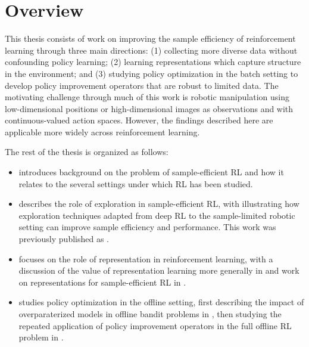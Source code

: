\section{Overview}

This thesis consists of work on improving the sample efficiency of reinforcement learning through three main directions: (1) collecting more diverse data without confounding policy learning; (2) learning representations which capture structure in the environment; and (3) studying policy optimization in the batch setting to develop policy improvement operators that are robust to limited data.
The motivating challenge through much of this work is robotic manipulation using low-dimensional positions or high-dimensional images as observations and with continuous-valued action spaces.
However, the findings described here are applicable more widely across reinforcement learning.

The rest of the thesis is organized as follows:
\begin{itemize}
    \item {} introduces background on the problem of sample-efficient RL and how it relates to the several settings under which RL has been studied.
    \item {} describes the role of exploration in sample-efficient RL, with  illustrating how exploration techniques adapted from deep RL to the sample-limited robotic setting can improve sample efficiency and performance. This work was previously published as \citet{whitney2021decoupled}.
    \item {} focuses on the role of representation in reinforcement learning, with a discussion of the value of representation learning more generally in  \citep{whitney2021evaluating} and work on representations for sample-efficient RL in  \citep{Whitney2020Dynamics-Aware}.
    \item {} studies policy optimization in the offline setting, first describing the impact of overparaterized models in offline bandit problems in  \citep{brandfonbrener2021offlinecontextual}, then studying the repeated application of policy improvement operators in the full offline RL problem in  \citep{brandfonbrener2021offlinerl}.
\end{itemize}









\printendnotes
